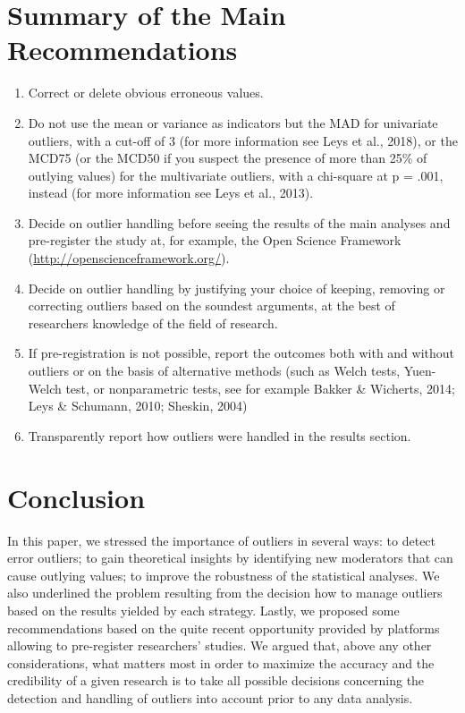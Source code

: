 \documentclass[man,floatsintext]{apa6}
\providecommand{\tightlist}{%
  \setlength{\itemsep}{0pt}\setlength{\parskip}{0pt}}
\begin{document}
\section{Summary of the Main
Recommendations}\label{summary-of-the-main-recommendations}

\begin{enumerate}
\def\labelenumi{\arabic{enumi})}
\tightlist
\item
  Correct or delete obvious erroneous values.
\item
  Do not use the mean or variance as indicators but the MAD for
  univariate outliers, with a cut-off of 3 (for more information see
  Leys et al., 2018), or the MCD75 (or the MCD50 if you suspect the
  presence of more than 25\% of outlying values) for the multivariate
  outliers, with a chi-square at p = .001, instead (for more information
  see Leys et al., 2013).
\item
  Decide on outlier handling before seeing the results of the main
  analyses and pre-register the study at, for example, the Open Science
  Framework (\url{http://openscienceframework.org/}).
\item
  Decide on outlier handling by justifying your choice of keeping,
  removing or correcting outliers based on the soundest arguments, at
  the best of researchers knowledge of the field of research.
\item
  If pre-registration is not possible, report the outcomes both with and
  without outliers or on the basis of alternative methods (such as Welch
  tests, Yuen-Welch test, or nonparametric tests, see for example Bakker
  \& Wicherts, 2014; Leys \& Schumann, 2010; Sheskin, 2004)
\item
  Transparently report how outliers were handled in the results section.
\end{enumerate}

\section{Conclusion}\label{conclusion}

In this paper, we stressed the importance of outliers in several ways:
to detect error outliers; to gain theoretical insights by identifying
new moderators that can cause outlying values; to improve the robustness
of the statistical analyses. We also underlined the problem resulting
from the decision how to manage outliers based on the results yielded by
each strategy. Lastly, we proposed some recommendations based on the
quite recent opportunity provided by platforms allowing to pre-register
researchers' studies. We argued that, above any other considerations,
what matters most in order to maximize the accuracy and the credibility
of a given research is to take all possible decisions concerning the
detection and handling of outliers into account prior to any data
analysis.
\end{document}
